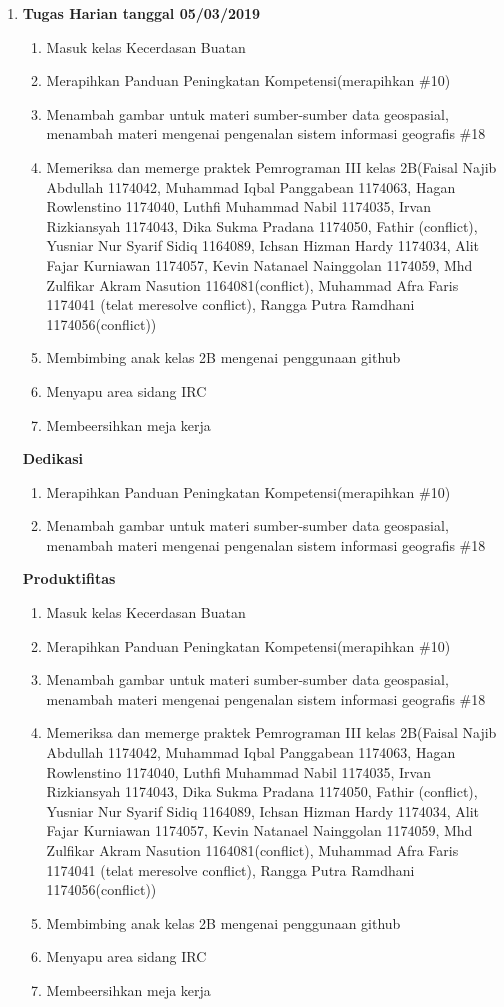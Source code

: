 \begin{enumerate}
\item \textbf{Tugas Harian tanggal 05/03/2019}
\begin{enumerate}
\item Masuk kelas Kecerdasan Buatan 
\item Merapihkan Panduan Peningkatan Kompetensi(merapihkan \#10)
\item Menambah gambar untuk materi sumber-sumber data geospasial, menambah materi mengenai pengenalan sistem informasi geografis \#18
\item Memeriksa dan memerge praktek Pemrograman III kelas 2B(Faisal Najib Abdullah 1174042, Muhammad Iqbal Panggabean 1174063, Hagan Rowlenstino 1174040, Luthfi Muhammad Nabil 1174035, Irvan Rizkiansyah 1174043, Dika Sukma Pradana 1174050, Fathir (conflict), Yusniar Nur Syarif Sidiq 1164089, Ichsan Hizman Hardy 1174034, Alit Fajar Kurniawan 1174057, Kevin Natanael Nainggolan 1174059, Mhd Zulfikar Akram Nasution 1164081(conflict), Muhammad Afra Faris 1174041 (telat meresolve conflict), Rangga Putra Ramdhani 1174056(conflict))
\item Membimbing anak kelas 2B mengenai penggunaan github
\item Menyapu area sidang IRC
\item Membeersihkan meja kerja 
\end{enumerate}

\textbf{Dedikasi}
\begin{enumerate}
\item Merapihkan Panduan Peningkatan Kompetensi(merapihkan \#10)
\item Menambah gambar untuk materi sumber-sumber data geospasial, menambah materi mengenai pengenalan sistem informasi geografis \#18
\end{enumerate}

\textbf{Produktifitas}
\begin{enumerate}
\item Masuk kelas Kecerdasan Buatan 
\item Merapihkan Panduan Peningkatan Kompetensi(merapihkan \#10)
\item Menambah gambar untuk materi sumber-sumber data geospasial, menambah materi mengenai pengenalan sistem informasi geografis \#18
\item Memeriksa dan memerge praktek Pemrograman III kelas 2B(Faisal Najib Abdullah 1174042, Muhammad Iqbal Panggabean 1174063, Hagan Rowlenstino 1174040, Luthfi Muhammad Nabil 1174035, Irvan Rizkiansyah 1174043, Dika Sukma Pradana 1174050, Fathir (conflict), Yusniar Nur Syarif Sidiq 1164089, Ichsan Hizman Hardy 1174034, Alit Fajar Kurniawan 1174057, Kevin Natanael Nainggolan 1174059, Mhd Zulfikar Akram Nasution 1164081(conflict), Muhammad Afra Faris 1174041 (telat meresolve conflict), Rangga Putra Ramdhani 1174056(conflict))
\item Membimbing anak kelas 2B mengenai penggunaan github
\item Menyapu area sidang IRC
\item Membeersihkan meja kerja 
\end{enumerate}


\end{enumerate}
